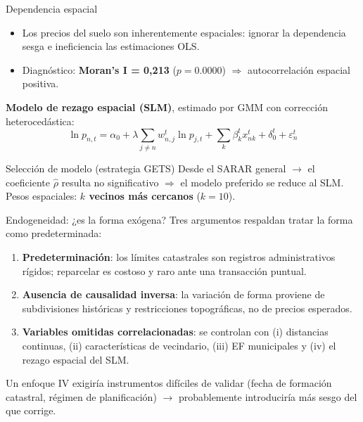 \documentclass[11pt,aspectratio=169]{beamer}
\begin{document}
\begin{frame}{Dependencia espacial}
  \begin{itemize}
    \item Los precios del suelo son \alert{inherentemente espaciales}: ignorar la dependencia sesga e ineficiencia las estimaciones OLS.
    \item Diagnóstico: \textbf{Moran's I = 0,213} ($p=0.0000$) $\Rightarrow$ autocorrelación espacial positiva.
  \end{itemize}
  \vspace{0.3em}
  \textbf{Modelo de rezago espacial (SLM)}, estimado por GMM con corrección heterocedástica:
  \[ \ln p_{n,t}=\alpha_0+\lambda\!\!\sum_{j\neq n}\!w_{n,j}^{t}\ln p_{j,t}+\sum_{k}\beta_k^{t}x_{nk}^{t}+\delta_0^{t}+\varepsilon_n^{t} \]
  \begin{block}{Selección de modelo (estrategia GETS)}
    \footnotesize Desde el SARAR general $\rightarrow$ el coeficiente $\hat\rho$ resulta no significativo $\Rightarrow$ el modelo preferido se reduce al \alert{SLM}. Pesos espaciales: \textbf{$k$ vecinos más cercanos} ($k=10$).
  \end{block}
\end{frame}

\begin{frame}{Endogeneidad: ¿es la forma exógena?}
  Tres argumentos respaldan tratar la forma como \alert{predeterminada}:
  \vspace{0.4em}
  \begin{enumerate}
    \item \textbf{Predeterminación}: los límites catastrales son registros administrativos rígidos; reparcelar es costoso y raro ante una transacción puntual.
    \item \textbf{Ausencia de causalidad inversa}: la variación de forma proviene de subdivisiones históricas y restricciones topográficas, no de precios esperados.
    \item \textbf{Variables omitidas correlacionadas}: se controlan con (i) distancias continuas, (ii) características de vecindario, (iii) EF municipales y (iv) el rezago espacial del SLM.
  \end{enumerate}
  \vspace{0.4em}
  \footnotesize Un enfoque IV exigiría instrumentos difíciles de validar (fecha de formación catastral, régimen de planificación) $\rightarrow$ probablemente introduciría más sesgo del que corrige.
\end{frame}
\end{document}
